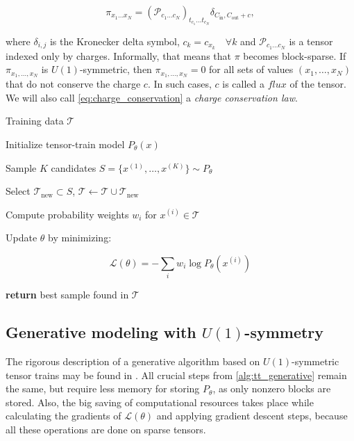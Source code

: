 \documentclass{article}
\theoremstyle{plain}
\theoremstyle{definition}
\theoremstyle{remark}
\begin{document}
\begin{equation}
    \pi_{x_1\dots x_N} = \left(\mathcal{P}_{c_{1}\dots c_{N}}\right)_{t_{c_1}\dots t_{c_N}} \delta_{C_{\text{in}},  C_{\text{out}} + c},
\label{eq:charge_conservation}
\end{equation}

where $\delta_{i,j}$ is the Kronecker delta symbol, $c_k=c_{x_k} \quad \forall k$ and $\mathcal{P}_{c_{1}\dots c_{N}}$ is a tensor indexed only by charges. Informally, that means that $\pi$ becomes block-sparse. If $\pi_{x_1,\dots, x_N}$ is $U(1)$-symmetric, then $\pi_{x_1,\dots, x_N}=0$ for all sets of values $(x_1,\dots, x_N)$ that do not conserve the charge $c$.  In such cases, $c$ is called a $flux$ of the tensor. We will also call \eqref{eq:charge_conservation} a \textit{charge conservation law}.

\begin{algorithm}
\caption{Generative Optimization with Tensor-Train}
\label{alg:tt_generative}
\begin{algorithmic}[1]

\REQUIRE Training data $\mathcal{T}$ 

\STATE Initialize tensor-train model $P_\theta(x)$ 

    \STATE Sample $K$ candidates $S = \{x^{(1)},\dots,x^{(K)}\} \sim P_\theta$ 

    \STATE Select $\mathcal{T}_{\text{new}} \subset S$, $\mathcal{T} \gets \mathcal{T} \cup \mathcal{T}_{\text{new}}$ 

    \STATE Compute probability weights $w_i$ for $x^{(i)} \in \mathcal{T}$

    \STATE Update $\theta$ by minimizing:
    
    \[\mathcal{L}(\theta) = - \sum_i w_i \log P_\theta(x^{(i)}) \]

\ENDFOR
\STATE \textbf{return} best sample found in $\mathcal{T}$
\end{algorithmic}
\end{algorithm}

\subsection{Generative modeling with $U(1)$-symmetry}
\label{subsec:U1_generative}

The rigorous description of a generative algorithm based on $U(1)$-symmetric tensor trains may be found in \cite{LopezPiqueres2023}. All crucial steps from \cref{alg:tt_generative} remain the same, but require less memory for storing $P_{\theta}$, as only nonzero blocks are stored. Also, the big saving of computational resources takes place while calculating the gradients of $\mathcal{L}(\theta)$ and applying gradient descent steps, because all these operations are done on sparse tensors.
\end{document}
